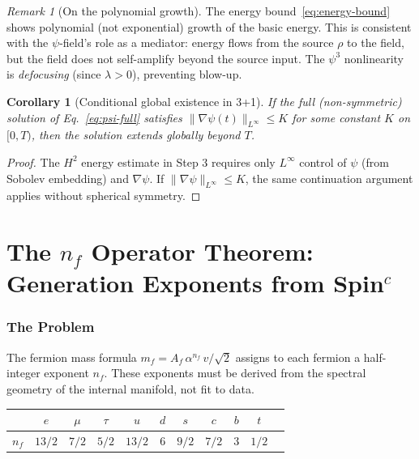 \documentclass[11pt,a4paper]{article}
\newtheorem{corollary}[theorem]{Corollary}
\theoremstyle{remark}
\newtheorem{remark}[theorem]{Remark}
\begin{document}
\begin{remark}[On the polynomial growth]
The energy bound~\eqref{eq:energy-bound} shows polynomial (not exponential)
growth of the basic energy. This is consistent with the $\psi$-field's role
as a mediator: energy flows from the source $\rho$ to the field, but the
field does not self-amplify beyond the source input. The $\psi^3$ nonlinearity
is \emph{defocusing} (since $\lambda > 0$), preventing blow-up.
\end{remark}

\begin{corollary}[Conditional global existence in 3+1]
\label{cor:conditional}
If the full (non-symmetric) solution of Eq.~\eqref{eq:psi-full} satisfies
$\|\nabla\psi(t)\|_{L^\infty} \leq K$ for some constant $K$ on $[0, T)$,
then the solution extends globally beyond $T$.
\end{corollary}

\begin{proof}
The $H^2$ energy estimate in Step 3 requires only $L^\infty$ control
of $\psi$ (from Sobolev embedding) and $\nabla\psi$. If $\|\nabla\psi\|_{L^\infty} \leq K$,
the same continuation argument applies without spherical symmetry.
\end{proof}


\newpage
\part{The $n_f$ Operator Theorem: Generation Exponents from Spin$^c$}
\label{part:nf-theorem}

\section{The Problem}

The fermion mass formula $m_f = A_f\,\alpha^{n_f}\,v/\sqrt{2}$ assigns to
each fermion a half-integer exponent $n_f$. These exponents must be derived
from the spectral geometry of the internal manifold, not fit to data.

\begin{center}
\begin{tabular}{lcccccccccc}
\toprule
& $e$ & $\mu$ & $\tau$ & $u$ & $d$ & $s$ & $c$ & $b$ & $t$ \\
\midrule
$n_f$ & $13/2$ & $7/2$ & $5/2$ & $13/2$ & $6$ & $9/2$ & $7/2$ & $3$ & $1/2$ \\
\bottomrule
\end{tabular}
\end{center}
\end{document}
